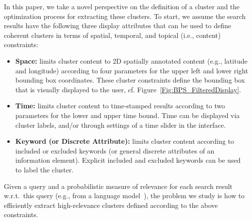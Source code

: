 In this paper, we take a novel perspective on the definition of a cluster and the optimization process for extracting these clusters. To start, we assume the search results have the following three display attributes that can be used to define coherent clusters in terms of spatial, temporal, and topical (i.e., content) constraints:
\begin{itemize}[topsep=2pt,leftmargin=*]
\item {\bf Space:} limits cluster content to 2D spatially annotated content (e.g., latitude and longitude) according to four parameters for the upper left and lower right bounding box coordinates.  These cluster constraints define the bounding box that is visually displayed to the user, cf. Figure~\ref{Fig:BPS_FilteredDisplay}.
\item {\bf Time:} limits cluster content to time-stamped results according to two parameters for the lower and upper time bound.  Time can be displayed via cluster labels, and/or through settings of a time slider in the interface.
\item {\bf Keyword (or Discrete Attribute):} limits cluster content according to included or excluded keywords (or general discrete attributes of an information element).
Explicit included and excluded keywords can be used to label the cluster. 
\end{itemize}
Given a query and a probabilistic measure of relevance for each search result w.r.t.\ this query (e.g., from a language model~\cite{Zhai2001}), %
the problem we study is how to efficiently extract high-relevance clusters defined according to the above constraints.

